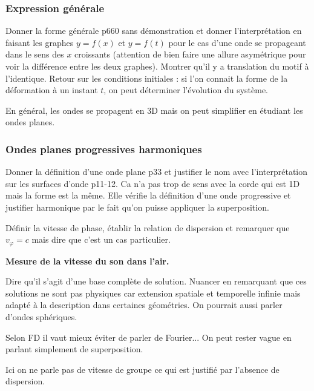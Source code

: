 \subsubsection{Expression générale}

Donner la forme générale \cite{Olivier2000} p660 sans démonstration et donner l'interprétation en faisant les graphes $y=f(x)$ et $y=f(t)$ pour le cas d'une onde se propageant dans le sens des $x$ croissants (attention de bien faire une allure asymétrique pour voir la différence entre les deux graphes).
Montrer qu'il y a translation du motif à l'identique.
Retour sur les conditions initiales : si l'on connait la forme de la déformation à un instant $t$, on peut déterminer l'évolution du système.

\begin{transition}
En général, les ondes se propagent en 3D mais on peut simplifier en étudiant les ondes planes.
\end{transition}

\subsubsection{Ondes planes progressives harmoniques}

Donner la définition d'une onde plane \cite{Brebec2004} p33 et justifier le nom avec l'interprétation sur les surfaces d'onde \cite{Thibierge2014} p11-12.
Ca n'a pas trop de sens avec la corde qui est 1D mais la forme est la même.
Elle vérifie la définition d'une onde progressive et justifier harmonique par le fait qu'on puisse appliquer la superposition.

Définir la vitesse de phase, établir la relation de dispersion et remarquer que $v_\varphi=c$ mais dire que c'est un cas particulier.

\begin{experience}
\textbf{Mesure de la vitesse du son dans l'air.}
\end{experience}

Dire qu'il s'agit d'une base complète de solution.
Nuancer en remarquant que ces solutions ne sont pas physiques car extension spatiale et temporelle infinie mais adapté à la description dans certaines géométries.
On pourrait aussi parler d'ondes sphériques.

\begin{remarque}
Selon FD il vaut mieux éviter de parler de Fourier...
On peut rester vague en parlant simplement de superposition.

\noindent
Ici on ne parle pas de vitesse de groupe ce qui est justifié par l'absence de dispersion.
\end{remarque}

